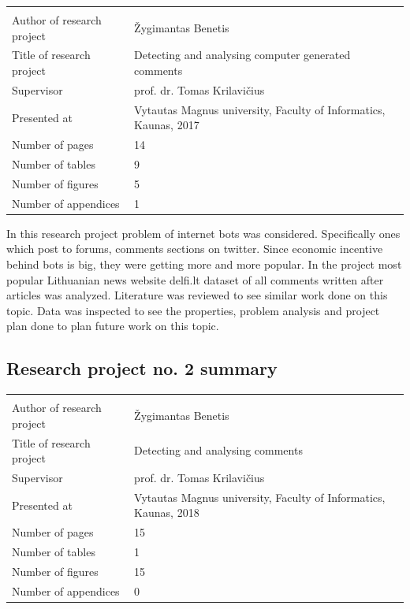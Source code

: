 \documentclass[a4paper,12pt]{article}
\begin{document}
	
	\noindent
	\begin{center}
		\begin{tabular}{L{4.5cm} L{8cm}}
			\\ 
			Author of research project & Žygimantas Benetis \\
			Title of research project & Detecting and analysing computer generated comments\\
			Supervisor & prof. dr. Tomas Krilavičius\\
			Presented at & Vytautas Magnus university, Faculty of Informatics, Kaunas, 2017\\
			Number of pages & 14\\
			Number of tables & 9\\
			Number of figures & 5\\
			Number of appendices & 1\\
		\end{tabular}
	\end{center} 
	
	\vspace{5mm}
	
	In this research project problem of internet bots was considered. Specifically ones which post to forums, comments sections on twitter. Since economic incentive behind bots is big, they were getting more and more popular. In the project most popular Lithuanian news website delfi.lt dataset of all comments written after articles was analyzed. Literature was reviewed to see similar work done on this topic. Data was inspected to see the properties, problem analysis and project plan done to plan future work on this topic. 
	
	\clearpage
	
	\subsection{Research project no. 2 summary}
	
	
	\noindent
	\begin{center}
		\begin{tabular}{L{4.5cm} L{8cm}}
			\\ 
			Author of research project & Žygimantas Benetis \\
			Title of research project & Detecting and analysing comments\\
			Supervisor & prof. dr. Tomas Krilavičius\\
			Presented at & Vytautas Magnus university, Faculty of Informatics, Kaunas, 2018\\
			Number of pages & 15\\
			Number of tables & 1\\
			Number of figures & 15\\
			Number of appendices & 0\\
		\end{tabular}
	\end{center} 
	
\end{document}
